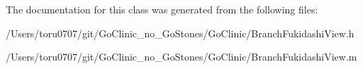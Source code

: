 The documentation for this class was generated from the following files:\begin{DoxyCompactItemize}
\item 
/Users/toru0707/git/GoClinic\_\-no\_\-GoStones/GoClinic/BranchFukidashiView.h\item 
/Users/toru0707/git/GoClinic\_\-no\_\-GoStones/GoClinic/BranchFukidashiView.m\end{DoxyCompactItemize}
